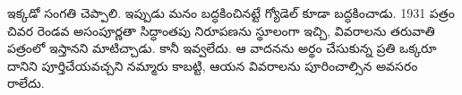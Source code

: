 \documentclass[../../../include/open-logic-section]{subfiles}
\begin{document}
\begin{digress}
ఇక్కడో సంగతి చెప్పాలి. ఇప్పుడు మనం బద్ధకించినట్టే గ్యోడెల్ కూడా బద్ధకించాడు.
1931 పత్రం చివర రెండవ అసంపూర్ణతా సిద్ధాంతపు నిరూపణను స్థూలంగా ఇచ్చి,
వివరాలను తరువాతి పత్రంలో ఇస్తానని మాటిచ్చాడు. కానీ ఇవ్వలేదు. ఆ వాదనను
అర్థం చేసుకున్న ప్రతి ఒక్కరూ దానిని పూర్తిచేయవచ్చని నమ్మారు కాబట్టి, ఆయన
వివరాలను పూరించాల్సిన అవసరం రాలేదు.
\end{digress}
\end{document}

